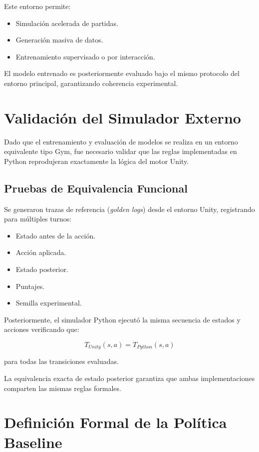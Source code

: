 Este entorno permite:

\begin{itemize}
    \item Simulación acelerada de partidas.
    \item Generación masiva de datos.
    \item Entrenamiento supervisado o por interacción.
\end{itemize}

El modelo entrenado es posteriormente evaluado bajo el mismo protocolo del entorno principal, garantizando coherencia experimental.

\section{Validación del Simulador Externo}

Dado que el entrenamiento y evaluación de modelos se realiza en un entorno equivalente tipo Gym, fue necesario validar que las reglas implementadas en Python reprodujeran exactamente la lógica del motor Unity.

\subsection{Pruebas de Equivalencia Funcional}

Se generaron trazas de referencia (\textit{golden logs}) desde el entorno Unity, registrando para múltiples turnos:

\begin{itemize}
    \item Estado antes de la acción.
    \item Acción aplicada.
    \item Estado posterior.
    \item Puntajes.
    \item Semilla experimental.
\end{itemize}

Posteriormente, el simulador Python ejecutó la misma secuencia de estados y acciones verificando que:

\[
T_{Unity}(s,a) = T_{Python}(s,a)
\]

para todas las transiciones evaluadas.

La equivalencia exacta de estado posterior garantiza que ambas implementaciones comparten las mismas reglas formales.

\section{Definición Formal de la Política Baseline}

